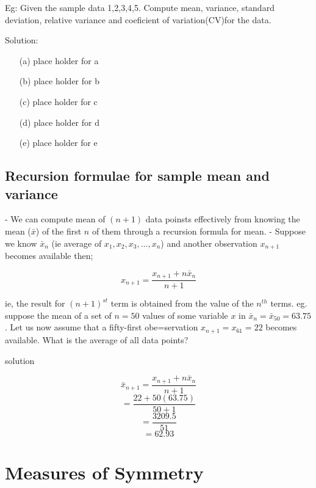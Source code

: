 \documentclass[12pt]{article}
\begin{document}
Eg: Given the sample data 1,2,3,4,5. Compute mean, variance, standard deviation, relative variance and coeficient of variation(CV)for the data.

Solution:

\begin{enumerate}
    \item[(a)] place holder for a
    \item[(b)] place holder for b
    \item[(c)] place holder for c
    \item[(d)] place holder for d
    \item[(e)] place holder for e
\end{enumerate}
\subsection{Recursion formulae for sample mean and variance}
- We can compute mean of $(n + 1)$ data poinsts effectively from knowing the mean ($\bar{x}$) of the first $n$ of them through a recursion formula for mean.
- Suppose we know $\bar{x}_{n}$ (ie average of $x_1, x_2, x_3, \dots, x_n$) and another observation $x_{n+1}$ becomes available then;

\begin{equation}
    x_{n + 1} = \frac{x_{n+1} + n\bar{x}_n}{n + 1}
\end{equation}

ie, the result for $(n + 1)^{st}$ term is obtained from the value of the $n^{th}$ terms.
eg. suppose the mean of a set of $n = 50$ values of some variable $x$ in $\bar{x}_n = \bar{x}_{50} = 63.75$. Let us now assume that a fifty-first obe=servation $x_{n + 1} = x_{61} = 22$ becomes available. What is the average of all data points?

solution



\begin{center}
    \[\bar{x}_{n + 1} = \frac{x_{n+1} + n\bar{x}_n}{n + 1}\]
    \[= \frac{22 + 50(63.75)}{50 + 1}\]
    \[= \frac{3209.5}{51}\]
    \[= 62.93\]
\end{center}



\section{Measures of Symmetry}
\end{document}
